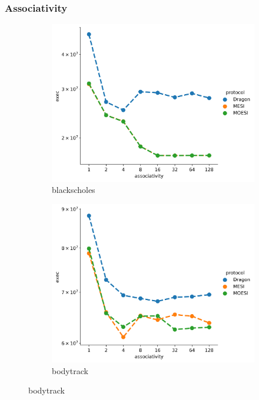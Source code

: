 \documentclass[nonacm,acmsmall,screen,11pt]{acmart}
\begin{document}
\subsubsection{Associativity}
\begin{figure}[htb!]
  \centering
  \begin{subfigure}{0.32\textwidth}
    \includegraphics[width=\textwidth]{associativity-blackscholes}
    \caption{blackscholes}
  \end{subfigure}
  \begin{subfigure}{0.32\textwidth}
    \includegraphics[width=\columnwidth]{associativity-bodytrack}
    \caption{bodytrack}
  \end{subfigure}

\end{figure}
\end{document}
